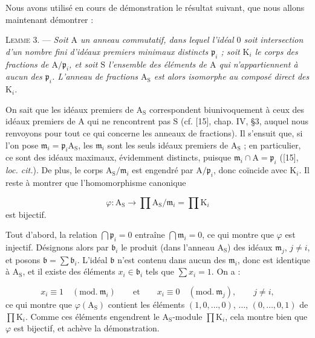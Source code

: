 Nous avons utilisé en cours de démonstration le résultat suivant, que nous allons maintenant démontrer :

\textsc{Lemme} 3. --- \emph{Soit $\mathrm{A}$ un anneau commutatif, dans lequel l'idéal $0$ soit intersection d'un nombre fini d'idéaux premiers minimaux distincts $\mathfrak{p}_i$ ; soit $\mathrm{K}_i$ le corps des fractions de $\mathrm{A}/\mathfrak{p}_i$, et soit $\mathrm{S}$ l'ensemble des éléments de $\mathrm{A}$ qui n'appartiennent à aucun des $\mathfrak{p}_i$. L'anneau de fractions $\mathrm{A}_\mathrm{S}$ est alors isomorphe au composé direct des $\mathrm{K}_i$.}

On sait que les idéaux premiers de $\mathrm{A}_\mathrm{S}$ correspondent biunivoquement à ceux des idéaux premiers de $\mathrm{A}$ qui ne rencontrent pas $\mathrm{S}$ (cf. [15], chap. IV, \S 3, auquel nous renvoyons pour tout ce qui concerne les anneaux de fractions). Il s'ensuit que, si l'on pose $\mathfrak{m}_i = \mathfrak{p}_i \mathrm{A}_\mathrm{S}$, les $\mathfrak{m}_i$ sont les seuls idéaux premiers de $\mathrm{A}_\mathrm{S}$ ; en particulier, ce sont des idéaux maximaux, évidemment distincts, puisque $\mathfrak{m}_i \cap \mathrm{A} = \mathfrak{p}_i$ ([15], \emph{loc. cit.}). De plus, le corps $\mathrm{A}_\mathrm{S}/\mathfrak{m}_i$ est engendré par $\mathrm{A}/\mathfrak{p}_i$, donc coïncide avec $\mathrm{K}_i$. Il reste à montrer que l'homomorphisme canonique

\begin{equation*}
\varphi : \mathrm{A}_\mathrm{S} \to \prod \mathrm{A}_\mathrm{S}/\mathfrak{m}_i = \prod \mathrm{K}_i
\end{equation*}
est bijectif.

Tout d'abord, la relation $\bigcap \mathfrak{p}_i = 0$ entraîne $\bigcap \mathfrak{m}_i = 0$, ce qui montre que $\varphi$ est injectif. Désignons alors par $\mathfrak{b}_i$ le produit (dans l'anneau $\mathrm{A}_\mathrm{S}$) des idéaux $\mathfrak{m}_j$, $j \neq i$, et posons $\mathfrak{b} = \sum \mathfrak{b}_i$. L'idéal $\mathfrak{b}$ n'est contenu dans aucun des $\mathfrak{m}_i$, donc est identique à $\mathrm{A}_\mathrm{S}$, et il existe des éléments $x_i \in \mathfrak{b}_i$ tels que $\sum x_i = 1$. On a :

\begin{equation*}
x_i \equiv 1 \quad (\mathrm{mod.}\ \mathfrak{m}_i) \qquad \mbox{et} \qquad x_i \equiv 0 \quad (\mathrm{mod.}\ \mathfrak{m}_j), \qquad j \neq i,
\end{equation*}
ce qui montre que $\varphi(\mathrm{A}_\mathrm{S})$ contient les éléments $(1, 0, \ldots, 0)$, $\ldots$, $(0, \ldots, 0, 1)$ de $\prod \mathrm{K}_i$. Comme ces éléments engendrent le $\mathrm{A}_\mathrm{S}$-module $\prod \mathrm{K}_i$, cela montre bien que $\varphi$ est bijectif, et achève la démonstration.


